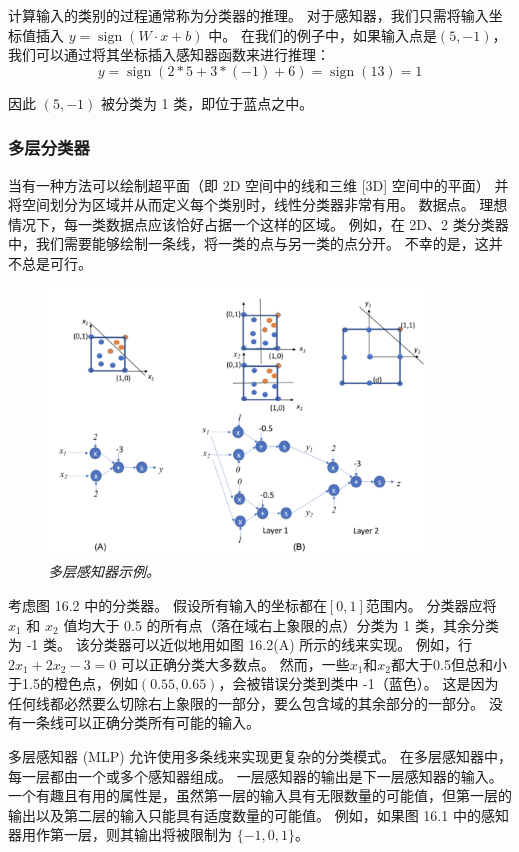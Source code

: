 计算输入的类别的过程通常称为分类器的推理。 
对于感知器，我们只需将输入坐标值插入 $y=\operatorname{sign}(W \cdot x+b)$ 中。 
在我们的例子中，如果输入点是$(5,-1)$，我们可以通过将其坐标插入感知器函数来进行推理：
$$
y=\operatorname{sign}(2 * 5+3 *(-1)+6)=\operatorname{sign}(13)=1
$$

因此 $(5,-1)$ 被分类为 1 类，即位于蓝点之中。

\subsubsection{多层分类器}
当有一种方法可以绘制超平面（即 $2 \mathrm{D}$ 空间中的线和三维 [3D] 空间中的平面）
并将空间划分为区域并从而定义每个类别时，线性分类器非常有用。 数据点。 
理想情况下，每一类数据点应该恰好占据一个这样的区域。 
例如，在 2D、2 类分类器中，我们需要能够绘制一条线，将一类的点与另一类的点分开。 不幸的是，这并不总是可行。

\begin{figure}[H]
	\centering
	\includegraphics[width=0.9\textwidth]{figs/F16.2.png}
	\caption{\textit{多层感知器示例。}}
\end{figure}

考虑图 16.2 中的分类器。 假设所有输入的坐标都在$[0,1]$范围内。 
分类器应将 $x_{1}$ 和 $x_{2}$ 值均大于 0.5 的所有点（落在域右上象限的点）分类为 1 类，其余分类为 -1 类。 
该分类器可以近似地用如图 16.2(A) 所示的线来实现。 例如，行 $2 x_{1}+2 x_{2}-3=0$ 可以正确分类大多数点。 
然而，一些$x_{1}$和$x_{2}$都大于0.5但总和小于1.5的橙色点，例如$(0.55,0.65)$，会被错误分类到类中 -1（蓝色）。 
这是因为任何线都必然要么切除右上象限的一部分，要么包含域的其余部分的一部分。 没有一条线可以正确分类所有可能的输入。

多层感知器 (MLP) 允许使用多条线来实现更复杂的分类模式。 在多层感知器中，每一层都由一个或多个感知器组成。 
一层感知器的输出是下一层感知器的输入。 
一个有趣且有用的属性是，虽然第一层的输入具有无限数量的可能值，但第一层的输出以及第二层的输入只能具有适度数量的可能值。 
例如，如果图 16.1 中的感知器用作第一层，则其输出将被限制为 $\{-1,0,1\}$。

